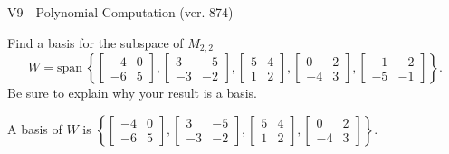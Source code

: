 \begin{exercise}
  \begin{exerciseTitle}V9 - Polynomial Computation (ver. 874)\end{exerciseTitle}
  \begin{exerciseStatement}
    Find a basis for the subspace of \(M_{2,2}\) 
\[W=\mathrm{span}\ \left\{\left[\begin{array}{cc}
-4 & 0 \\
-6 & 5
\end{array}\right] , \left[\begin{array}{cc}
3 & -5 \\
-3 & -2
\end{array}\right] , \left[\begin{array}{cc}
5 & 4 \\
1 & 2
\end{array}\right] , \left[\begin{array}{cc}
0 & 2 \\
-4 & 3
\end{array}\right] , \left[\begin{array}{cc}
-1 & -2 \\
-5 & -1
\end{array}\right]\right\}.\]
 Be sure to explain why your result is a basis.


  \end{exerciseStatement}
  \begin{exerciseAnswer}
   A basis of \(W\) is  \(\left\{\left[\begin{array}{cc}
-4 & 0 \\
-6 & 5
\end{array}\right] , \left[\begin{array}{cc}
3 & -5 \\
-3 & -2
\end{array}\right] , \left[\begin{array}{cc}
5 & 4 \\
1 & 2
\end{array}\right] , \left[\begin{array}{cc}
0 & 2 \\
-4 & 3
\end{array}\right]\right\}\).
  


  \end{exerciseAnswer}
\end{exercise}